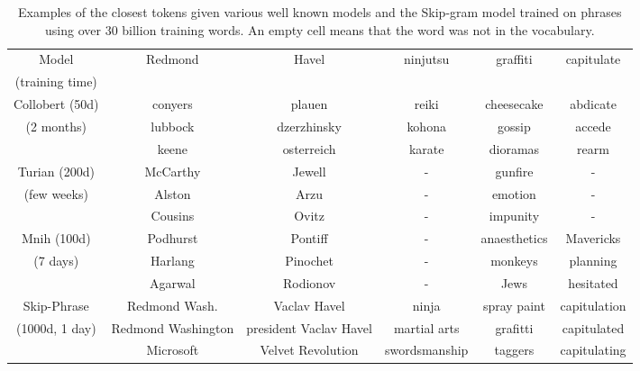 \documentclass{article}
\begin{document}
\begin{table}
\small
  \begin{center}
  \begin{tabular}{|c||c|c|c|c|c|}
    \hline
    Model                 & Redmond & Havel       & ninjutsu & graffiti   & capitulate \\
    (training time)       &         &             &          &            &            \\
    \hline
    \hline
    Collobert (50d)       & conyers & plauen      & reiki    & cheesecake & abdicate   \\
    (2 months)            & lubbock & dzerzhinsky & kohona   & gossip     & accede     \\
                          & keene   & osterreich  & karate   & dioramas   & rearm      \\
    \hline
    Turian (200d)         & McCarthy & Jewell     & -        & gunfire    & -      \\
    (few weeks)           & Alston   & Arzu       & -        & emotion    & -      \\
                          & Cousins  & Ovitz      & -        & impunity   & -      \\
    \hline
    Mnih (100d)           & Podhurst & Pontiff    & -        & anaesthetics & Mavericks        \\
    (7 days)              & Harlang  & Pinochet   & -        & monkeys      & planning         \\
                          & Agarwal  & Rodionov   & -        & Jews         & hesitated        \\
    \hline
    Skip-Phrase           & Redmond Wash.         & Vaclav Havel            & ninja         & spray paint   & capitulation         \\
    (1000d, 1 day)        & Redmond Washington    & president Vaclav Havel  & martial arts  & grafitti      & capitulated          \\
                          & Microsoft             & Velvet Revolution       & swordsmanship & taggers       & capitulating      \\
    \hline
  \end{tabular}
  \end{center}
\caption{\label{table:closest_words} Examples of the closest tokens given various
well known models and the Skip-gram model trained on phrases using over 30 billion training words. An empty cell
means that the word was not in the vocabulary.}
\normalsize
\end{table}
\end{document}
